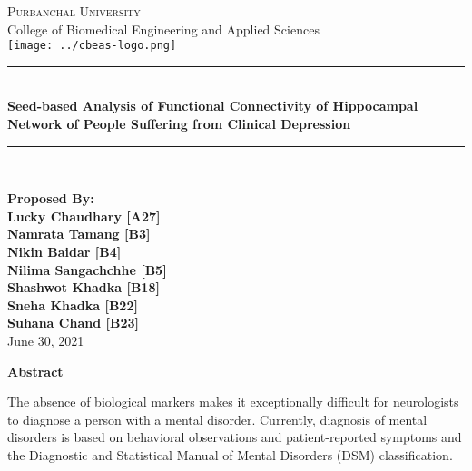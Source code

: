 \documentclass{article}
\newcommand{\HRule}{\rule{\linewidth}{0.1mm}}
\begin{document}
\begin{titlepage}
\begin{center}

  \textsc{\huge Purbanchal University}\\[1cm]
  {\huge College of Biomedical Engineering and Applied Sciences}\\[1cm]
  \texttt{[image: ../cbeas-logo.png]}\\[1cm]

  \color{red} \HRule \\[0.4cm] \color{black}
  {\huge \bfseries Seed-based Analysis of Functional Connectivity of
  Hippocampal Network of People Suffering from Clinical Depression}\\[0.2cm]
  \color{red} \HRule \\[2cm] \color{black}

\textbf{
  \Large Proposed By:\\[0.2cm]
\Large Lucky Chaudhary [A27]\\ Namrata Tamang [B3]\\ Nikin Baidar
  [B4]\\ Nilima Sangachchhe [B5]\\ Shashwot Khadka [B18]\\ Sneha
  Khadka [B22]\\Suhana Chand [B23]\\[1cm]}
\vfill
{\Large June 30, 2021}

\end{center}
\end{titlepage}

\clearpage
\setcounter{page}{1}

\begin{center}
  \textbf{\large Abstract}
\end{center}

  The absence of biological markers makes it exceptionally difficult
  for neurologists to diagnose a person with a mental disorder.
  Currently, diagnosis of mental disorders is based on behavioral
  observations and patient-reported symptoms and the Diagnostic and
  Statistical Manual of Mental Disorders (DSM) classification.
\end{document}

